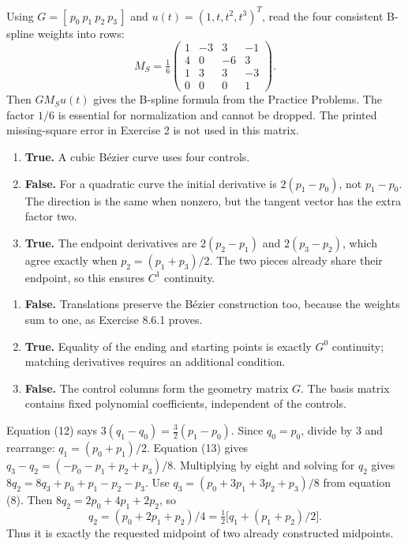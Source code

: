 Using $G=[\,p_0\ p_1\ p_2\ p_3\,]$ and $u(t)=(1,t,t^2,t^3)^T$,
read the four consistent B-spline weights into rows:
\[
 M_S=\tfrac16\begin{pmatrix}
 1&-3&3&-1\\4&0&-6&3\\1&3&3&-3\\0&0&0&1
 \end{pmatrix}.
\]
Then $GM_Su(t)$ gives the B-spline formula from the Practice Problems.
The factor $1/6$ is essential for normalization and cannot be dropped.
The printed missing-square error in Exercise 2 is not used in this matrix.

\begin{enumerate}[label=(\alph*)]
\item \textbf{True.} A cubic B\'ezier curve uses four controls.
\item \textbf{False.} For a quadratic curve the initial derivative is
$2(p_1-p_0)$, not $p_1-p_0$. The direction is the same when nonzero,
but the tangent vector has the extra factor two.
\item \textbf{True.} The endpoint derivatives are $2(p_2-p_1)$ and
$2(p_3-p_2)$, which agree exactly when $p_2=(p_1+p_3)/2$.
The two pieces already share their endpoint, so this ensures $C^1$ continuity.
\end{enumerate}

\begin{enumerate}[label=(\alph*)]
\item \textbf{False.} Translations preserve the B\'ezier construction
too, because the weights sum to one, as Exercise 8.6.1 proves.
\item \textbf{True.} Equality of the ending and starting points is
exactly $G^0$ continuity; matching derivatives requires an additional condition.
\item \textbf{False.} The control columns form the geometry matrix
$G$. The basis matrix contains fixed polynomial coefficients, independent of the controls.
\end{enumerate}

Equation (12) says $3(q_1-q_0)=\tfrac32(p_1-p_0)$.
Since $q_0=p_0$, divide by $3$ and rearrange:
$q_1=(p_0+p_1)/2$.
Equation (13) gives
$q_3-q_2=(-p_0-p_1+p_2+p_3)/8$.
Multiplying by eight and solving for $q_2$ gives
$8q_2=8q_3+p_0+p_1-p_2-p_3$.
Use $q_3=(p_0+3p_1+3p_2+p_3)/8$ from equation (8).
Then $8q_2=2p_0+4p_1+2p_2$, so
\[
 q_2=(p_0+2p_1+p_2)/4
 =\tfrac12\big[q_1+(p_1+p_2)/2\big].
\]
Thus it is exactly the requested midpoint of two already constructed midpoints.

